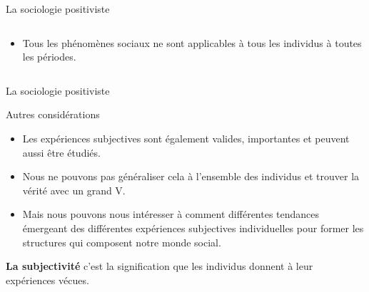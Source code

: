 \documentclass[10pt]{beamer}
\begin{document}
\begin{frame}{La sociologie positiviste}
    \begin{columns}
        \begin{column}{0.8\textwidth}
    \begin{itemize}
        \item Tous les phénomènes sociaux ne sont applicables à tous les individus à toutes les périodes.
    \end{itemize}
        \end{column}
    \end{columns}
\end{frame}

\begin{frame}{La sociologie positiviste}
    \begin{block}{Autres considérations}
    \end{block}
    \begin{itemize}
        \item Les expériences subjectives sont également valides, importantes et peuvent aussi être étudiés.
        \item Nous ne pouvons pas généraliser cela à l'ensemble des individus et trouver la vérité avec un grand V.
        \item Mais nous pouvons nous intéresser à comment différentes tendances émergeant des différentes expériences subjectives individuelles pour former les structures qui composent notre monde social.
    \end{itemize}
\textbf{La subjectivité} c'est la signification que les individus donnent à leur expériences vécues.
\end{frame}
\end{document}
